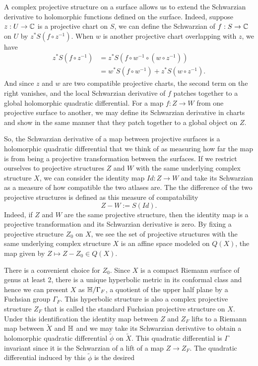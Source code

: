 A complex projective structure on a surface allows us to extend the Schwarzian derivative to holomorphic functions defined on the surface.
Indeed, suppose $z: U \to \mathbb{C}$ is a projective chart on $S$, we can define the Schwarzian of $f:S \to \mathbb{C}$ on $U$ by $z^*S(f \circ z^{-1})$.
When $w$ is another projective chart overlapping with $z$, we have
\begin{align*}
z^*S(f \circ z^{-1})
&= z^* S(f \circ w^{-1} \circ (w \circ z^{-1})) \\
&= w^*S(f \circ w^{-1}) + z^*S(w \circ z^{-1}).
\end{align*}
And since $z$ and $w$ are two compatible projective charts, the second term on the right vanishes, and the local Schwarzian derivative of $f$ patches together to a global holomorphic quadratic differential.
For a map $f: Z \to W$ from one projective surface to another, we may define its Schwarzian derivative in charts and show in the same manner that they patch together to a global object on $Z$.

So, the Schwarzian derivative of a map between projective surfaces is a holomorphic quadratic differential that we think of as measuring how far the map is from being a projective transformation between the surfaces. 
If we restrict ourselves to projective structures $Z$ and $W$ with the same underlying complex structure $X$, we can consider the identity map $Id: Z \to W$ and take its Schwarzian as a measure of how compatible the two atlases are. 
The the difference of the two projective structures is defined as this measure of compatability
\[
Z - W := S(Id).
\]
Indeed, if $Z$ and $W$ are the same projective structure, then the identity map is a projective transformation and its Schwarzian derivative is zero.
By fixing a projective structure $Z_0$ on $X$, we see the set of projective structures with the same underlying complex structure $X$ is an affine space modeled on $Q(X)$, the map given by $Z \mapsto Z-Z_0 \in Q(X)$.

There is a convenient choice for $Z_0$. 
Since $X$ is a compact Riemann surface of genus at least 2, there is a unique hyperbolic metric in its conformal class and hence we can present $X$ as $\mathbb{H}/\Gamma_F$, a quotient of the upper half plane by a Fuchsian group $\Gamma_F$. 
This hyperbolic structure is also a complex projective structure $Z_F$ that is called the standard Fuchsian projective structure on $X$. 
Under this identification the identity map between $Z$ and $Z_F$ lifts to a Riemann map between $\tilde{X}$ and  $\mathbb{H}$ and we may take its Schwarzian derivative to obtain a holomorphic quadratic differential $\tilde{\phi}$ on $\tilde{X}$. 
This quadratic differential is $\Gamma$ invariant since it is the Schwarzian of a lift of a map $Z \to Z_F$. 
The quadratic differential induced by this $\tilde{\phi}$ is the desired 